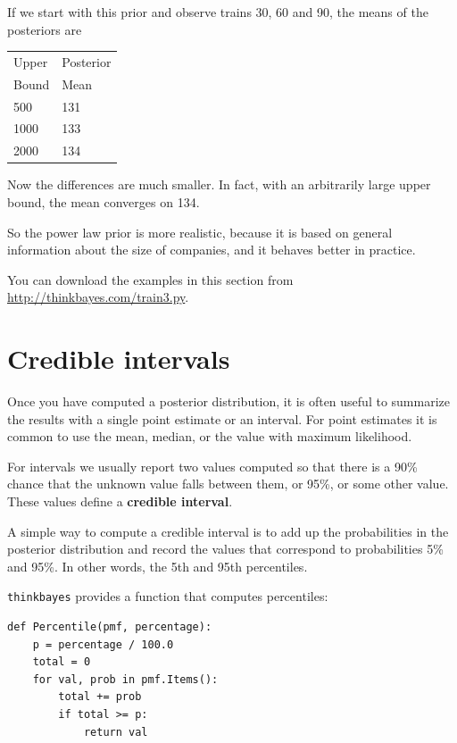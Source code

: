 \documentclass[12pt]{book}
\begin{document}
If we start with this prior and observe trains 30, 60 and 90,
the means of the posteriors are

  \begin{tabular}{|l|l|}
  \hline
  Upper & Posterior \\
  Bound & Mean \\
  \hline
  500 & 131 \\
  1000 & 133 \\
  2000 & 134 \\
  \hline
  \end{tabular}

Now the differences are much smaller.  In fact,
with an arbitrarily large upper bound, the mean converges on 134.

So the power law prior is more realistic, because it is based on
general information about the size of companies, and it
behaves better in practice.

You can download the examples in this section from
\url{http://thinkbayes.com/train3.py}.


\section{Credible intervals}

Once you have computed a posterior distribution, it is often useful
to summarize the results with a single point estimate or an interval.
For point estimates it is common to use the mean, median, or the
value with maximum likelihood.

For intervals we usually report two values computed
so that there is a 90\% chance that the unknown value falls
between them, or 95\%, or some other value.
These values define a {\bf credible interval}.

A simple way to compute a credible interval is to add up the
probabilities in the posterior distribution and record the values
that correspond to probabilities 5\% and 95\%.  In other words,
the 5th and 95th percentiles.

\verb"thinkbayes" provides a function that computes percentiles:

\begin{verbatim}
def Percentile(pmf, percentage):
    p = percentage / 100.0
    total = 0
    for val, prob in pmf.Items():
        total += prob
        if total >= p:
            return val    
\end{verbatim}
\end{document}
